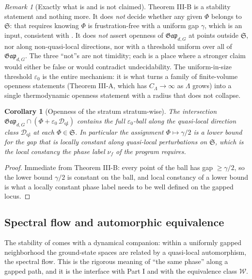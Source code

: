 \documentclass[12pt]{article}
\newcommand{\Gap}{\mathfrak{Gap}}              %
\newcommand{\Weq}{\mathcal{W}}                 %
\theoremstyle{plain}
\newtheorem{corollary}[corollary]{Corollary}
\theoremstyle{definition}
\theoremstyle{remark}
\newtheorem{remark}[remark]{Remark}
\begin{document}
\begin{remark}[Exactly what is and is not claimed]
\label{rem:IIIB-scope}
Theorem III-B is a stability statement and nothing more. It does \emph{not} decide
whether any given $\Phi$ belongs to $\mathfrak{S}$: that requires knowing $\Phi$ is
frustration-free with a uniform gap $\gamma$, which is an input, consistent with
. It does \emph{not} assert openness of $\Gap_{d,G}$ at points
outside $\mathfrak{S}$, nor along non-quasi-local directions, nor with a threshold
uniform over all of $\Gap_{d,G}$. The three ``not''s are not timidity; each is a place
where a stronger claim would either be false or would contradict undecidability. The
uniform-in-size threshold $\varepsilon_0$ is the entire mechanism: it is what turns a
family of finite-volume openness statements (Theorem III-A, which has $C_\Lambda\to\infty$
as $\Lambda$ grows) into a single thermodynamic openness statement with a radius that
does not collapse.
\end{remark}

\begin{corollary}[Openness of the stratum stratum-wise]
\label{cor:stratum-open}
The intersection $\Gap_{d,G}\cap(\Phi+\varepsilon_0\,\mathcal{D}_{\mathrm{ql}})$
contains the full $\varepsilon_0$-ball along the quasi-local direction class
$\mathcal{D}_{\mathrm{ql}}$ at each $\Phi\in\mathfrak{S}$. In particular the assignment
$\Phi\mapsto\gamma/2$ is a lower bound for the gap that is \emph{locally constant along
quasi-local perturbations} on $\mathfrak{S}$, which is the local constancy the phase
label $\nu_f$ of the program requires.
\end{corollary}

\begin{proof}
Immediate from Theorem III-B: every point of the ball has gap $\ge\gamma/2$, so the
lower bound $\gamma/2$ is constant on the ball, and local constancy of a lower bound
is what a locally constant phase label needs to be well defined on the gapped locus.
\end{proof}

\subsection{Spectral flow and automorphic equivalence}
\label{sec:stability-flow}

The stability of  comes with a dynamical companion: within a
uniformly gapped neighborhood the ground-state spaces are related by a quasi-local
automorphism, the spectral flow. This is the rigorous meaning of ``the same phase''
along a gapped path, and it is the interface with Part I and with the equivalence
class $\Weq$.
\end{document}
